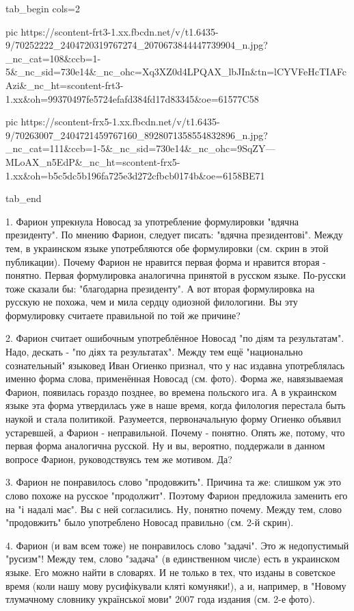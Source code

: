 \ifcmt
  tab_begin cols=2

     pic https://scontent-frt3-1.xx.fbcdn.net/v/t1.6435-9/70252222_2404720319767274_2070673844447739904_n.jpg?_nc_cat=108&ccb=1-5&_nc_sid=730e14&_nc_ohc=Xq3XZ0d4LPQAX_lbJIn&tn=lCYVFeHcTIAFcAzi&_nc_ht=scontent-frt3-1.xx&oh=99370497fe5724efafd384fd17d83345&oe=61577C58

     pic https://scontent-frx5-1.xx.fbcdn.net/v/t1.6435-9/70263007_2404721459767160_8928071358554832896_n.jpg?_nc_cat=111&ccb=1-5&_nc_sid=730e14&_nc_ohc=9SqZY---MLoAX_n5EdP&_nc_ht=scontent-frx5-1.xx&oh=b5c5dc5b196fa725e3d272cfbcb0174b&oe=6158BE71

  tab_end
\fi


1. Фарион упрекнула Новосад за употребление формулировки "вдячна президенту".
По мнению Фарион, следует писать: "вдячна президентові". Между тем, в
украинском языке употребляются обе формулировки (см. скрин в этой публикации).
Почему Фарион не нравится первая форма и нравится вторая - понятно. Первая
формулировка аналогична принятой в русском языке. По-русски тоже сказали бы:
"благодарна президенту". А вот вторая формулировка на русскую не похожа, чем и
мила сердцу одиозной филологини. Вы эту формулировку считаете правильной по той
же причине?

2. Фарион считает ошибочным употреблённое Новосад "по діям та результатам".
Надо, дескать - "по діях та результатах". Между тем ещё "национально
сознательный" языковед Иван Огиенко признал, что у нас издавна употреблялась
именно форма слова, применённая Новосад (см. фото). Форма же, навязываемая
Фарион, появилась гораздо позднее, во времена польского ига. А в украинском
языке эта форма утвердилась уже в наше время, когда филология перестала быть
наукой и стала политикой. Разумеется, первоначальную форму Огиенко объявил
устаревшей, а Фарион - неправильной. Почему - понятно. Опять же, потому, что
первая форма аналогична русской. Ну и вы, вероятно, поддержали в данном вопросе
Фарион, руководствуясь тем же мотивом. Да?

3. Фарион не понравилось слово "продовжить". Причина та же: слишком уж это
слово похоже на русское "продолжит". Поэтому Фарион предложила заменить его на
"і надалі має". Вы с ней согласились. Ну, понятно почему. Между тем, слово
"продовжить" было употреблено Новосад правильно (см. 2-й скрин).

4. Фарион (и вам всем тоже) не понравилось слово "задачі". Это ж недопустимый
"русизм"! Между тем, слово "задача" (в единственном числе) есть в украинском
языке. Его можно найти в словарях. И не только в тех, что изданы в советское
время (коли нашу мову русифікували кляті комуняки!), а и, например, в "Новому
тлумачному словнику української мови" 2007 года издания (см. 2-е фото).

